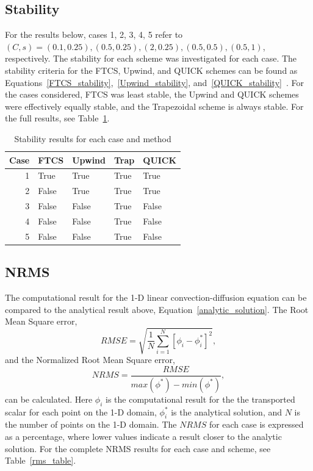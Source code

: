\documentclass[twocolumn,10pt]{asme2ej}
\begin{document}
\subsection{Stability}
For the results below, cases 1, 2, 3, 4, 5 refer to $(C, s) = (0.1, 0.25), (0.5, 0.25), (2, 0.25), (0.5, 0.5), (0.5, 1)$, respectively. The stability for each scheme was investigated for each case. The stability criteria for the FTCS, Upwind, and QUICK schemes can be found as Equations~\ref{FTCS_stability},~\ref{Upwind_stability}, and~\ref{QUICK_stability}~\cite{LectureA}. For the cases considered, FTCS was least stable, the Upwind and QUICK schemes were effectively equally stable, and the Trapezoidal scheme is always stable. For the full results, see Table~\ref{stability_table}.

\begin{table}[tb]
\begin{center}
\begin{tabular}{|r | l l l l|}
\hline
Case & FTCS & Upwind & Trap & QUICK  \\
\hline
1 & True  & True  & True & True  \\
2 & False & True  & True & True  \\
3 & False & False & True & False \\
4 & False & False & True & False \\
5 & False & False & True & False \\
\hline
\end{tabular}
\caption{Stability results for each case and method}
\label{stability_table}
\end{center}
\end{table}

\subsection{NRMS}
The computational result for the 1-D linear convection-diffusion equation can be compared to the analytical result above, Equation~\ref{analytic_solution}. The Root Mean Square error,
\begin{equation}
RMSE = \sqrt{\frac{1}{N}\sum\limits_{i=1}^N[\phi_i - \phi^*_i]^2},
\end{equation}
and the Normalized Root Mean Square error,
\begin{equation}
NRMS = \dfrac{RMSE}{max(\phi^*)-min(\phi^*)},
\end{equation}
can be calculated. Here $\phi_i$ is the computational result for the the transported scalar for each point on the 1-D domain, $\phi^*_i$ is the analytical solution, and $N$ is the number of points on the 1-D domain. The $NRMS$ for each case is expressed as a percentage, where lower values indicate a result closer to the analytic solution. For the complete NRMS results for each case and scheme, see Table~\ref{rms_table}.
\end{document}

